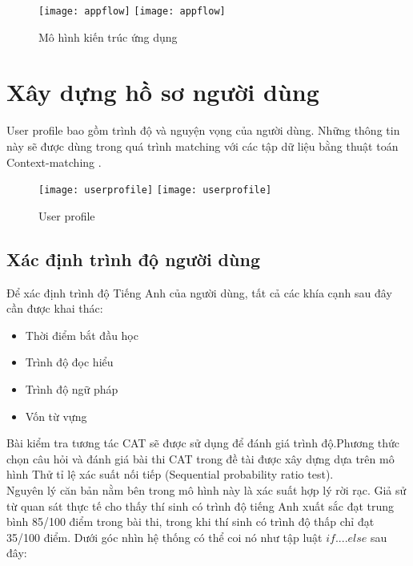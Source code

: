 \begin{figure}[H]
  \begin{center}
    \ifpdf
      \texttt{[image: appflow]}
    \else
      \texttt{[image: appflow]}
    \fi
    \caption{Mô hình kiến trúc ứng dụng}
    \label{Appflow}
  \end{center}
\end{figure}

\section{Xây dựng hồ sơ người dùng}
User profile bao gồm trình độ và nguyện vọng của người dùng. Những thông tin này sẽ được dùng trong quá trình matching với các tập dữ liệu bằng thuật toán Context-matching . \\

\begin{figure}[H]
  \begin{center}
    \ifpdf
      \texttt{[image: userprofile]}
    \else
      \texttt{[image: userprofile]}
    \fi
    \caption{User profile}
    \label{Userprofile}
  \end{center}
\end{figure}

\subsection{Xác định trình độ người dùng}

Để xác định trình độ Tiếng Anh của người dùng, tất cả các khía cạnh sau đây cần được khai thác:
\begin{itemize}
\item Thời điểm bắt đầu học
\item Trình độ đọc hiểu
\item Trình độ ngữ pháp
\item Vốn từ vựng
\end{itemize}

Bài kiểm tra tương tác CAT sẽ được sử dụng để đánh giá trình độ.Phương thức chọn câu hỏi và đánh giá bài thi CAT trong đề tài được xây dựng dựa trên mô hình Thử tỉ lệ xác suất nối tiếp \cite{welchfrick} (Sequential probability ratio test).\\ 

Nguyên lý căn bản nằm bên trong mô hình này là xác suất hợp lý rời rạc. Giả sử từ quan sát thực tế cho thấy thí sinh có trình độ tiếng Anh xuất sắc đạt trung bình 85/100 điểm trong bài thi, trong khi thí sinh có trình độ thấp chỉ đạt 35/100 điểm. Dưới góc nhìn hệ thống có thể coi nó như tập luật $if....else$ sau đây:

